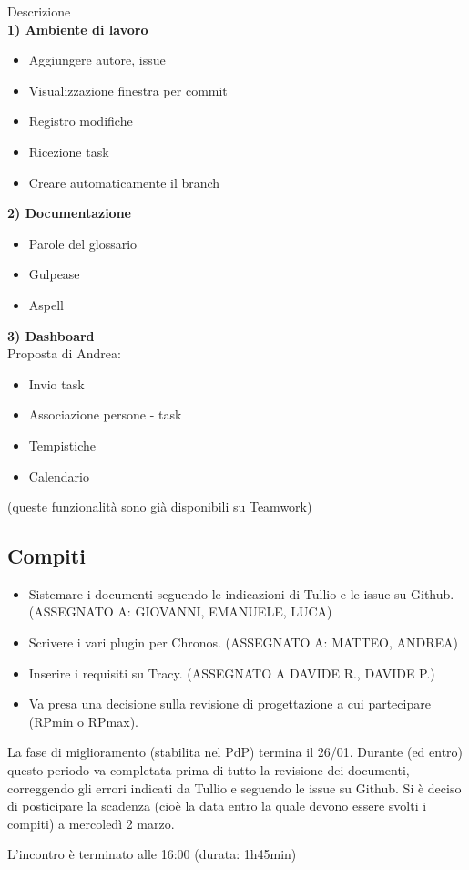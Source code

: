 \documentclass[11pt]{meetingmins}
\begin{document}
Descrizione\\

\textbf{1) Ambiente di lavoro}

\begin{itemize}
\item Aggiungere autore, issue
\item Visualizzazione finestra per commit
\item Registro modifiche
\item Ricezione task
\item Creare automaticamente il branch
\end{itemize}

\textbf{2) Documentazione}

\begin{itemize}
\item Parole del glossario
\item Gulpease
\item Aspell
\end{itemize}

\textbf{3) Dashboard}\\

Proposta di Andrea:

\begin{itemize}
\item Invio task
\item Associazione persone - task
\item Tempistiche
\item Calendario
\end{itemize}

(queste funzionalità sono già disponibili su Teamwork)

\subsection{Compiti}

\begin{itemize}
\item Sistemare i documenti seguendo le indicazioni di Tullio e le issue su Github. (ASSEGNATO A: GIOVANNI, EMANUELE, LUCA)
\item Scrivere i vari plugin per Chronos. (ASSEGNATO A: MATTEO, ANDREA)
\item Inserire i requisiti su Tracy. (ASSEGNATO A DAVIDE R., DAVIDE P.)
\item Va presa una decisione sulla revisione di progettazione a cui partecipare (RPmin o RPmax).
\end{itemize}

La fase di miglioramento (stabilita nel PdP) termina il 26/01. Durante (ed entro) questo periodo va completata prima di tutto la revisione dei documenti, correggendo gli errori indicati da Tullio e seguendo le issue su Github.
Si è deciso di posticipare la scadenza (cioè la data entro la quale devono essere svolti i compiti) a mercoledì 2 marzo.

L'incontro è terminato alle 16:00 (durata: 1h45min)\\

\end{document}
